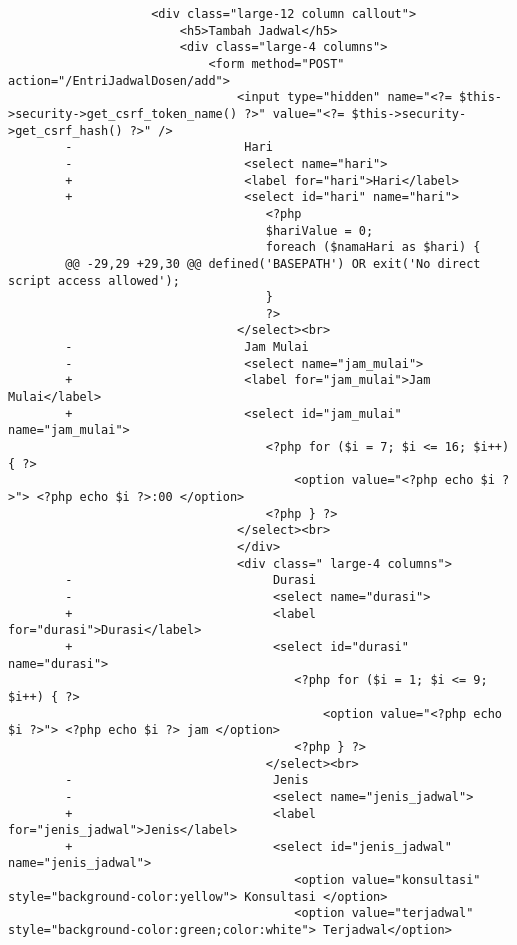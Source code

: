 \begin{itemize}
\begin{lstlisting}
                    <div class="large-12 column callout">
                        <h5>Tambah Jadwal</h5>
                        <div class="large-4 columns">
                            <form method="POST" action="/EntriJadwalDosen/add">
                                <input type="hidden" name="<?= $this->security->get_csrf_token_name() ?>" value="<?= $this->security->get_csrf_hash() ?>" />
        -                        Hari
        -                        <select name="hari"> 
        +                        <label for="hari">Hari</label>
        +                        <select id="hari" name="hari"> 
                                    <?php
                                    $hariValue = 0;
                                    foreach ($namaHari as $hari) {
        @@ -29,29 +29,30 @@ defined('BASEPATH') OR exit('No direct script access allowed');
                                    }
                                    ?>
                                </select><br>
        -                        Jam Mulai
        -                        <select name="jam_mulai"> 
        +                        <label for="jam_mulai">Jam Mulai</label>
        +                        <select id="jam_mulai" name="jam_mulai"> 
                                    <?php for ($i = 7; $i <= 16; $i++) { ?>
                                        <option value="<?php echo $i ?>"> <?php echo $i ?>:00 </option>
                                    <?php } ?>
                                </select><br>
                                </div>
                                <div class=" large-4 columns">
        -                            Durasi
        -                            <select name="durasi"> 
        +                            <label for="durasi">Durasi</label>
        +                            <select id="durasi" name="durasi"> 
                                        <?php for ($i = 1; $i <= 9; $i++) { ?>
                                            <option value="<?php echo $i ?>"> <?php echo $i ?> jam </option>
                                        <?php } ?>
                                    </select><br>
        -                            Jenis  
        -                            <select name="jenis_jadwal"> 
        +                            <label for="jenis_jadwal">Jenis</label>
        +                            <select id="jenis_jadwal" name="jenis_jadwal"> 
                                        <option value="konsultasi" style="background-color:yellow"> Konsultasi </option>
                                        <option value="terjadwal" style="background-color:green;color:white"> Terjadwal</option>

\end{lstlisting}
\end{itemize}
